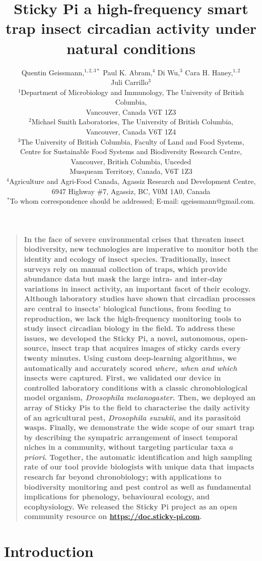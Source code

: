 \documentclass[12pt]{article}
\title{Sticky Pi \DIFdelbegin \DIFdel{, }\DIFdelend \DIFaddbegin \DIFadd{is }\DIFaddend a high-frequency smart trap \DIFdelbegin \DIFdel{to study }\DIFdelend \DIFaddbegin \DIFadd{that enables the study of }\DIFaddend insect circadian activity under natural conditions}
\author
{Quentin Geissmann,$^{1,2,3\ast}$ Paul K. Abram,$^{4}$ Di Wu,$^{3}$ Cara H. Haney,$^{1,2}$\\
	Juli Carrillo$^{3}$
	\\
	\normalsize{$^{1}$Department of Microbiology and Immunology, The University of British Columbia,}\\
	\normalsize{Vancouver, Canada V6T 1Z3}\\
	\normalsize{$^{2}$Michael Smith Laboratories, The University of British Columbia,}\\
	\normalsize{Vancouver, Canada V6T 1Z4}\\
	\normalsize{$^{3}$The University of British Columbia, Faculty of Land and Food Systems,}\\
	\normalsize{Centre for Sustainable Food Systems and Biodiversity Research Centre,}\\
	\normalsize{Vancouver, British Columbia, Unceded \musqueam{}}\\
	\normalsize{Musqueam Territory, Canada, V6T 1Z3}\\
	\normalsize{$^{4}$Agriculture and Agri-Food Canada, Agassiz Research and Development Centre,}\\
	\normalsize{6947 Highway \#7, Agassiz, BC, V0M 1A0, Canada}\\
	\normalsize{$^\ast$To whom correspondence should be addressed; E-mail: qgeissmann@gmail.com.}
}
\date{}
\newenvironment{sciabstract}{%
	\begin{quote} \bf}
	{\end{quote}}
\begin{document}


	\maketitle 
	\newpage

	\begin{linenumbers}

		
		\begin{sciabstract}		
			In the face of severe environmental crises that threaten insect biodiversity, new technologies are imperative to monitor both the identity and ecology of insect species. Traditionally, insect surveys rely on manual collection of traps, which provide abundance data but mask the large intra- and inter-day variations in insect activity, an important facet of their ecology. Although laboratory studies have shown that circadian processes are central to insects' biological functions, from feeding to reproduction, we lack the high-frequency monitoring tools to study insect circadian biology in the field. To address these issues, we developed the Sticky Pi, a novel, autonomous, open-source, insect trap that acquires images of sticky cards every twenty minutes. Using custom deep-learning algorithms, we automatically and accurately scored \emph{where, when and which} insects were captured. First, we validated our device in controlled laboratory conditions with a classic chronobiological model organism, \emph{Drosophila melanogaster}. Then, we deployed an array of Sticky Pis to the field to characterise the daily activity of an agricultural pest, \emph{Drosophila suzukii}, and its parasitoid wasps. Finally, we demonstrate the wide scope of our smart trap by describing the sympatric arrangement of insect temporal niches in a community, without targeting particular taxa \emph{a priori}. Together, the automatic identification and high sampling rate of our tool provide biologists with unique data that impacts research far beyond chronobiology; with applications to biodiversity monitoring and pest control as well as fundamental implications for phenology, behavioural ecology, and ecophysiology. We released the Sticky Pi project as an open community resource on \href{https://doc.sticky-pi.com}{https://doc.sticky-pi.com}.
		\end{sciabstract}

		\baselineskip24pt

		
		\section*{Introduction}


\end{linenumbers}
\end{document}
